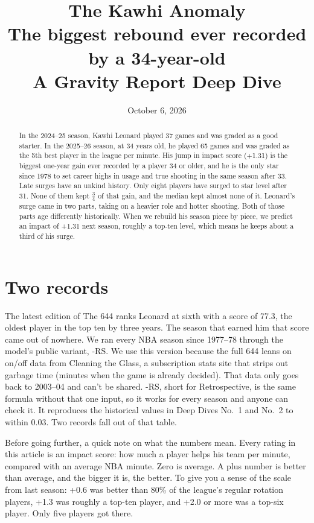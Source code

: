 \documentclass[11pt]{article}
\title{\textbf{The Kawhi Anomaly}\\[4pt]
\large The biggest rebound ever recorded by a 34-year-old\\[2pt]
\normalsize A Gravity Report Deep Dive}
\author{}
\date{October 6, 2026}
\begin{document}
\maketitle
\vspace{-2.5em}

\begin{abstract}
\noindent
In the 2024--25 season, Kawhi Leonard played 37 games and was graded as a good starter. In
the 2025--26 season, at 34 years old, he played 65 games and was graded as the 5th best player
in the league per minute. His jump in impact score (+1.31) is the biggest one-year gain ever
recorded by a player 34 or older, and he is the only star since 1978 to set career highs in
usage and true shooting in the same season after 33. Late surges have an unkind history. Only
eight players have surged to star level after 31. None of them kept $\tfrac{3}{4}$ of that gain,
and the median kept almost none of it. Leonard's surge came in two parts, taking on a heavier
role and hotter shooting. Both of those parts age differently historically. When we rebuild his
season piece by piece, we predict an impact of +1.31 next season, roughly a top-ten level, which
means he keeps about a third of his surge.
\end{abstract}

\section*{Two records}

The latest edition of The 644 ranks Leonard at sixth with a score of 77.3, the oldest player in
the top ten by three years. The
season that earned him that score came out of nowhere. We ran every NBA season since 1977--78
through the model's public variant, \gravity-RS. We use this version because the full 644 leans
on on/off data from Cleaning the Glass, a subscription stats site that strips out garbage time
(minutes when the game is already decided). That data only goes back to 2003--04 and can't be
shared.
\gravity-RS, short for \gravity{} Retrospective, is the same formula without that one input, so
it works for every season and anyone can check it. It reproduces the historical values in
Deep Dives No.~1 and No.~2 to within 0.03.
Two records fall out of that table.

Before going further, a quick note on what the numbers mean. Every rating in this article is an
impact score: how much a player helps his team per minute, compared with an average NBA minute.
Zero is average. A plus number is better than average, and the bigger it is, the better. To give
you a sense of the scale from last season: +0.6 was better than 80\% of the league's regular
rotation players, +1.3 was roughly a top-ten player, and +2.0 or more was a top-six player. Only
five players got there.
\end{document}
